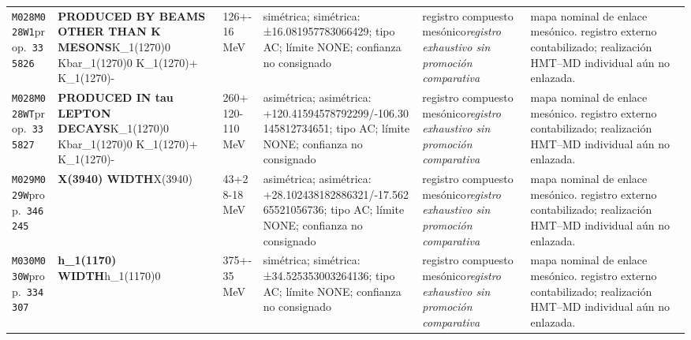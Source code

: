 \begin{landscape}
\begin{longtable}{L{1.85cm}L{4.45cm}L{2.35cm}L{4.05cm}L{3.35cm}L{7.15cm}}
\texttt{M028}\newline \texttt{M028W1}\newline prop.\ \texttt{335826} & \textbf{PRODUCED BY BEAMS OTHER THAN K MESONS}\newline K\_\allowbreak{}1(1270)0 \textbar{}\allowbreak{} Kbar\_\allowbreak{}1(1270)0 \textbar{}\allowbreak{} K\_\allowbreak{}1(1270)+ \textbar{}\allowbreak{} K\_\allowbreak{}1(1270)- & 126+-16\,MeV & simétrica; simétrica: ±16.081957783066429; tipo AC; límite NONE; confianza no consignado & registro compuesto mesónico\newline \emph{registro exhaustivo sin promoción comparativa} & mapa nominal de enlace mesónico. registro externo contabilizado; realización HMT--MD individual aún no enlazada. \\
\texttt{M028}\newline \texttt{M028WT}\newline prop.\ \texttt{335827} & \textbf{PRODUCED IN tau LEPTON DECAYS}\newline K\_\allowbreak{}1(1270)0 \textbar{}\allowbreak{} Kbar\_\allowbreak{}1(1270)0 \textbar{}\allowbreak{} K\_\allowbreak{}1(1270)+ \textbar{}\allowbreak{} K\_\allowbreak{}1(1270)- & 260+120-110\,MeV & asimétrica; asimétrica: +120.41594578792299/-106.30145812734651; tipo AC; límite NONE; confianza no consignado & registro compuesto mesónico\newline \emph{registro exhaustivo sin promoción comparativa} & mapa nominal de enlace mesónico. registro externo contabilizado; realización HMT--MD individual aún no enlazada. \\
\texttt{M029}\newline \texttt{M029W}\newline prop.\ \texttt{346245} & \textbf{X(3940) WIDTH}\newline X(3940) & 43+28-18\,MeV & asimétrica; asimétrica: +28.102438182886321/-17.56265521056736; tipo AC; límite NONE; confianza no consignado & registro compuesto mesónico\newline \emph{registro exhaustivo sin promoción comparativa} & mapa nominal de enlace mesónico. registro externo contabilizado; realización HMT--MD individual aún no enlazada. \\
\texttt{M030}\newline \texttt{M030W}\newline prop.\ \texttt{334307} & \textbf{h\_\allowbreak{}1(1170) WIDTH}\newline h\_\allowbreak{}1(1170)0 & 375+-35\,MeV & simétrica; simétrica: ±34.525353003264136; tipo AC; límite NONE; confianza no consignado & registro compuesto mesónico\newline \emph{registro exhaustivo sin promoción comparativa} & mapa nominal de enlace mesónico. registro externo contabilizado; realización HMT--MD individual aún no enlazada. \\

\end{longtable}
\end{landscape}
